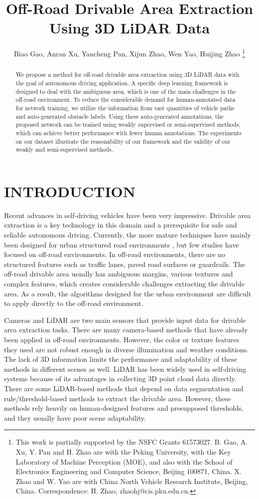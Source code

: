 \documentclass[letterpaper, 10 pt, conference]{ieeeconf}  %
\title{\LARGE \bf
Off-Road Drivable Area Extraction Using 3D LiDAR Data
}
\author{\authorblockN
	{Biao Gao\authorrefmark{1},
		Anran Xu\authorrefmark{1}, 
		Yancheng Pan\authorrefmark{1},
		Xijun Zhao\authorrefmark{2},
		Wen Yao\authorrefmark{2},
		Huijing Zhao\authorrefmark{1}}
	\authorblockA{\authorrefmark{1}Peking University, Beijing, China}
	\authorblockA{\authorrefmark{2}China North Vehicle Research Institute, Beijing, China}
	\thanks{This work is partially supported by the NSFC Grants 61573027. B. Gao, A. Xu, Y. Pan and H. Zhao are with the Peking University, with the Key Laboratory of Machine Perception (MOE), and also with the School of Electronics Engineering and Computer Science, Beijing 100871, China. X. Zhao and W. Yao are with China North Vehicle Research Institute, Beijing, China. Correspondence: H. Zhao, zhaohj@cis.pku.edu.cn.}}
\begin{document}

\maketitle

\begin{abstract}
	
We propose a method for off-road drivable area extraction using 3D LiDAR data with the goal of autonomous driving application. A specific deep learning framework is designed to deal with the ambiguous area, which is one of the main challenges in the off-road environment. To reduce the considerable demand for human-annotated data for network training, we utilize the information from vast quantities of vehicle paths and auto-generated obstacle labels. Using these auto-generated annotations, the proposed network can be trained using weakly supervised or semi-supervised methods, which can achieve better performance with fewer human annotations. The experiments on our dataset illustrate the reasonability of our framework and the validity of our weakly  and semi-supervised methods.

\end{abstract}


\section{INTRODUCTION}

Recent advances in self-driving vehicles have been very impressive. Drivable area extraction is a key technology in this domain and a prerequisite for safe and reliable autonomous driving\cite{BarHillel2014}.
Currently, the more mature techniques have mainly been designed for urban structured road environments\cite{He2004}\cite{Alvarez2011}
, but few studies have focused on off-road environments. In off-road environments, there are no structured features such as traffic lanes, paved road surfaces or guardrails. The off-road drivable area usually has ambiguous margins, various textures and complex features, which creates considerable challenges extracting the drivable area.
As a result, the algorithms designed for the urban environment are difficult to apply directly to the off-road environment. 

Cameras and LiDAR are two main sensors that provide input data for drivable area extraction tasks. There are many camera-based methods that have already been applied in off-road environments\cite{Mei2018}.
However, the color or texture features they used are not robust enough in diverse illumination and weather conditions. The lack of 3D information limits the performance and adaptability of these methods in different scenes as well\cite{Xiao2015}.
LiDAR has been widely used in self-driving systems because of its advantages in collecting 3D point cloud data directly. There are some LiDAR-based methods that depend on data segmentation and rule/threshold-based methods to extract the drivable area\cite{Zhang2010}.
However, these methods rely heavily on human-designed features and presupposed thresholds, and they usually have poor scene adaptability. 
\end{document}
